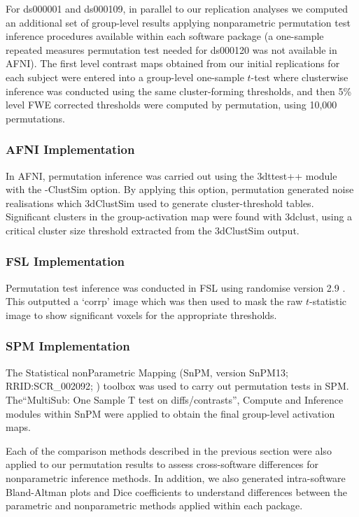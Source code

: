 For ds000001 and ds000109, in parallel to our replication analyses we computed an additional set of group-level results applying nonparametric permutation test inference procedures available within each software package (a one-sample repeated measures permutation test needed for ds000120 was not available in AFNI). The first level contrast maps obtained from our initial replications for each subject were entered into a group-level one-sample $t$-test where clusterwise inference was conducted using the same cluster-forming thresholds, and then 5\% level FWE corrected thresholds were computed by permutation, using 10,000 permutations.

\subsubsection{AFNI Implementation}
In AFNI, permutation inference was carried out using the 3dttest++ module with the -ClustSim option. By applying this option, permutation generated noise realisations which 3dClustSim used to generate cluster-threshold tables. Significant clusters in the group-activation map were found with 3dclust, using a critical cluster size threshold extracted from the 3dClustSim output. 

\subsubsection{FSL Implementation}
Permutation test inference was conducted in FSL using randomise version 2.9 \citep{Winkler2016-mw}. This outputted a `corrp' image which was then used to mask the raw $t$-statistic image to show significant voxels for the appropriate thresholds. 

\subsubsection{SPM Implementation}
The Statistical nonParametric Mapping (SnPM, version SnPM13; RRID:SCR\_002092; \citep{Nichols2002-kf}) toolbox was used to carry out permutation tests in SPM. The``MultiSub: One Sample T test on diffs/contrasts'', Compute and Inference modules within SnPM were applied to obtain the final group-level activation maps.

Each of the comparison methods described in the previous section were also applied to our permutation results to assess cross-software differences for nonparametric inference methods. In addition, we also generated intra-software Bland-Altman plots and Dice coefficients to understand differences between the parametric and nonparametric methods applied within each package. 


